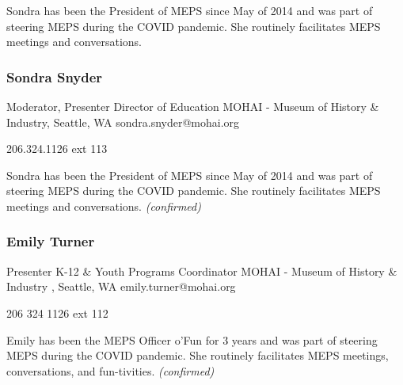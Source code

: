 \documentclass{report}
\begin{document}
              Sondra has been the President of MEPS since May of 2014 and was part of steering MEPS during the COVID pandemic. She routinely facilitates MEPS meetings and conversations.\newline


              
                \subsubsection*{ Sondra Snyder }
                Moderator, Presenter\newline
                Director of Education\newline
                MOHAI - Museum of History \& Industry, Seattle, WA 
                \newline
                sondra.snyder@mohai.org\newline
                
                206.324.1126 ext 113\newline

                Sondra has been the President of MEPS since May of 2014 and was part of steering MEPS during the COVID pandemic. She routinely facilitates MEPS meetings and conversations.\newline
                \emph{ (confirmed) }
              

              
                \subsubsection*{ Emily  Turner  }
                Presenter\newline
                K-12 \& Youth Programs Coordinator\newline
                MOHAI - Museum of History \& Industry , Seattle, WA
                \newline
                emily.turner@mohai.org\newline
                
                206 324 1126 ext 112\newline

                Emily has been the MEPS Officer o’Fun for 3 years and was part of steering MEPS during the COVID pandemic. She routinely facilitates MEPS meetings, conversations, and fun-tivities.
                \emph{ (confirmed) }
              
\end{document}
